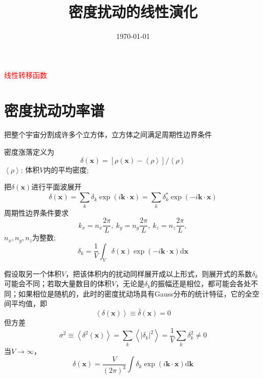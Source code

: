 \documentclass[12pt,a4paper]{article}
\title{密度扰动的线性演化}
\author{}
\date{\today}
\renewcommand{\vec}[1]{\boldsymbol{#1}}
\newcommand{\dif}{\mathrm{d}}
\begin{document}
\maketitle
\section{}

\textcolor{red}{线性转移函数}

\section{密度扰动功率谱}
把整个宇宙分割成许多个立方体，立方体之间满足周期性边界条件

密度涨落定义为
\begin{equation}
\delta(\vec{x}) = \left[\rho(\vec{x}) -\left\langle \rho \right\rangle \right] /\left\langle \rho \right\rangle 
\end{equation}
$\left\langle \rho \right\rangle$: 体积$V$内的平均密度;

把$\delta(\vec{x})$进行平面波展开
\begin{equation}
\delta(\vec{x}) = \sum_k \delta_k \exp (i\vec{k}\cdot \vec{x}) = \sum_k \delta^*_k \exp(-i\vec{k}\cdot \vec{x})
\end{equation}
周期性边界条件要求
\begin{equation}
k_x = n_x \frac{2\pi}{L}, ~k_y = n_y \frac{2\pi}{L}, ~k_z = n_z \frac{2\pi}{L}, 
\end{equation}
$n_x, n_y, n_z$为整数;
\begin{equation}
\delta_k = \frac{1}{V} \int_V \delta(\vec{x}) \exp (-i\vec{k}\cdot \vec{x}) \dif \vec{x}
\end{equation}

假设取另一个体积$V$，把该体积内的扰动同样展开成以上形式，则展开式的系数$\delta_k$可能会不同；若取大量数目的体积$V$，无论是$\delta_k$的振幅还是相位，都可能会各处不同；如果相位是随机的，此时的密度扰动场具有Gauss分布的统计特征，它的全空间平均值，即
\begin{equation}
\left\langle \delta(\vec{x}) \right\rangle \equiv \bar{\delta}(\vec{x}) = 0
\end{equation}
但方差
\begin{equation}
\sigma^2 \equiv \left\langle \delta^2(\vec{x}) \right\rangle = \sum_k \left\langle |\delta_k|^2 \right\rangle = \frac{1}{V} \sum_k \delta_k^2 \neq 0
\end{equation}
当$V\rightarrow \infty$，
\begin{equation}
\delta(\vec{x}) = \frac{V}{(2\pi)^3} \int \delta_k \exp (i\vec{k}\cdot \vec{x}) \dif \vec{k}
\end{equation}
\end{document}
